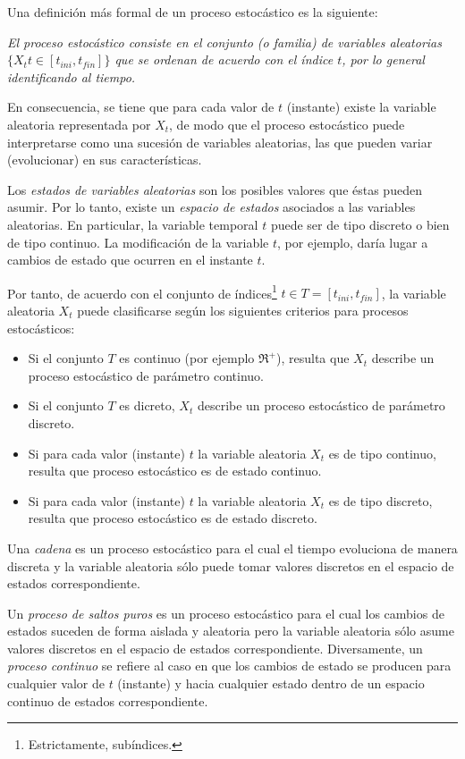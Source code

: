 Una definici\'on m\'as formal de un proceso estoc\'astico es la siguiente:


\textsl{ El proceso estoc\'astico consiste en el conjunto (o familia) de variables aleatorias $\{X_{t} t \in [t_{ini}, t_{fin}]\}$ que se
ordenan de acuerdo con el \'indice $t$, por lo general identificando al tiempo.}

En consecuencia, se tiene que para cada valor de $t$ (instante) existe la variable aleatoria representada por $X_{t}$, de modo que el 
proceso estoc\'astico puede interpretarse como una sucesi\'on de variables aleatorias, las que pueden variar (evolucionar) en sus 
caracter\'isticas.

Los \textsl{estados de variables aleatorias} son los posibles valores que \'estas pueden asumir.
%
Por lo tanto, existe un \textsl{espacio de estados} asociados a las variables aleatorias.
%
En particular, la variable temporal $t$ puede ser de tipo discreto o bien de tipo continuo. La modificaci\'on de la variable $t$, por 
ejemplo, dar\'ia lugar a cambios de estado que ocurren en el instante $t$.

Por tanto, de acuerdo con el conjunto de \'indices\footnote{Estrictamente, sub\'indices.} $t \in T=[t_{ini}, t_{fin}]$, la variable 
aleatoria $X_{t}$ puede clasificarse seg\'un los siguientes criterios para procesos estoc\'asticos:

\begin{itemize}
 \item Si el conjunto $T$ es continuo (por ejemplo $\Re^{+}$), resulta que $X_{t}$ describe un proceso estoc\'astico de par\'ametro continuo.
 \item Si el conjunto $T$ es dicreto, $X_{t}$ describe un proceso estoc\'astico de par\'ametro discreto.
 \item Si para cada valor (instante) $t$ la variable aleatoria $X_{t}$ es de tipo continuo, resulta que proceso estoc\'astico es de estado 
 continuo.
 \item Si para cada valor (instante) $t$ la variable aleatoria $X_{t}$ es de tipo discreto, resulta que proceso estoc\'astico es de estado 
 discreto.
\end{itemize}

Una \textsl{cadena} es un proceso estoc\'astico para el cual el tiempo evoluciona de manera discreta y la variable aleatoria s\'olo puede 
tomar valores discretos en el espacio de estados correspondiente. 
%

Un \textsl{proceso de saltos puros} es un proceso estoc\'astico para el cual los cambios de estados suceden de forma aislada y aleatoria 
pero la variable aleatoria s\'olo asume valores discretos en el espacio de estados correspondiente. 
%
Diversamente, un \textsl{proceso continuo} se refiere al caso en que los cambios de estado se producen para cualquier valor de $t$ (instante)
y hacia cualquier estado dentro de un espacio continuo de estados correspondiente.


